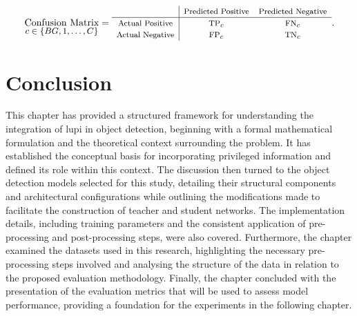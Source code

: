 \begin{equation}
\underset{\text{\fontsize{9}{11}\selectfont $c \in \{BG, 1, \dots, C\}$}}{\text{Confusion Matrix}} =
\begin{array}{c|cc}
& \text{\footnotesize Predicted Positive} & \text{\footnotesize Predicted Negative} \\
\hline
\text{\footnotesize Actual Positive} & \text{\footnotesize TP}_c & \text{\footnotesize FN}_c \\
\text{\footnotesize Actual Negative} & \text{\footnotesize FP}_c & \text{\footnotesize TN}_c \\
\end{array}.
\label{eq:confusion_matrix}
\end{equation}


\section{Conclusion}
\label{sec:4_conclusion}

This chapter has provided a structured framework for understanding the integration of \gls{lupi} in object detection, beginning with a formal mathematical formulation and the theoretical context surrounding the problem. It has established the conceptual basis for incorporating privileged information and defined its role within this context. The discussion then turned to the object detection models selected for this study, detailing their structural components and architectural configurations while outlining the modifications made to facilitate the construction of teacher and student networks. The implementation details, including training parameters and the consistent application of pre-processing and post-processing steps, were also covered. Furthermore, the chapter examined the datasets used in this research, highlighting the necessary pre-processing steps involved and analysing the structure of the data in relation to the proposed evaluation methodology. Finally, the chapter concluded with the presentation of the evaluation metrics that will be used to assess model performance, providing a foundation for the experiments in the following chapter.


